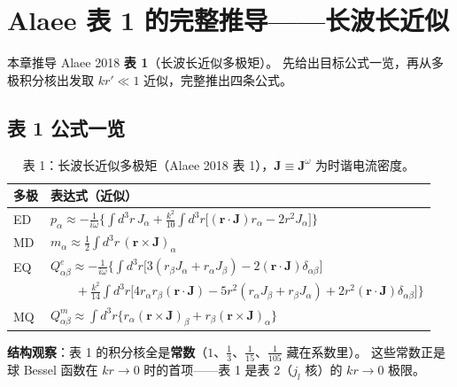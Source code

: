 \section{Alaee 表 1 的完整推导——长波长近似}

本章推导 Alaee 2018 \textbf{表 1}（长波长近似多极矩）。
先给出目标公式一览，再从多极积分核出发取 $kr'\ll1$ 近似，完整推出四条公式。

\subsection{表 1 公式一览}

\begin{table}[htbp]
\centering
\small
\begin{tabular}{ll}
\toprule
\textbf{多极} & \textbf{表达式（近似）} \\
\midrule
ED & $\displaystyle p_\alpha \approx -\frac{1}{i\omega}\Bigg\{\int d^3r\,J_\alpha
  + \frac{k^2}{10}\int d^3r\bigl[(\mathbf{r}\cdot\mathbf{J})r_\alpha - 2r^2 J_\alpha\bigr]\Bigg\}$ \\[1.2em]
MD & $\displaystyle m_\alpha \approx \frac12\int d^3r\,(\mathbf{r}\times\mathbf{J})_\alpha$ \\[1.2em]
EQ & $\displaystyle Q^e_{\alpha\beta} \approx -\frac{1}{i\omega}\Bigg\{
  \int d^3r\bigl[3(r_\beta J_\alpha + r_\alpha J_\beta) - 2(\mathbf{r}\cdot\mathbf{J})\delta_{\alpha\beta}\bigr]$ \\[0.5em]
  & $\displaystyle\qquad + \frac{k^2}{14}\int d^3r\bigl[4r_\alpha r_\beta(\mathbf{r}\cdot\mathbf{J})
  - 5r^2(r_\alpha J_\beta + r_\beta J_\alpha) + 2r^2(\mathbf{r}\cdot\mathbf{J})\delta_{\alpha\beta}\bigr]\Bigg\}$ \\[1.2em]
MQ & $\displaystyle Q^m_{\alpha\beta} \approx \int d^3r\bigl\{
  r_\alpha(\mathbf{r}\times\mathbf{J})_\beta + r_\beta(\mathbf{r}\times\mathbf{J})_\alpha\bigr\}$ \\[0.5em]
\bottomrule
\end{tabular}
\caption*{表 1：长波长近似多极矩（Alaee 2018 表 1），$\mathbf{J}\equiv\mathbf{J}^\omega$ 为时谐电流密度。}
\end{table}

\begin{noteworthy}
\textbf{结构观察}：表 1 的积分核全是\textbf{常数}（$1$、$\frac13$、$\frac1{15}$、$\frac1{105}$ 藏在系数里）。
这些常数正是球 Bessel 函数在 $kr\to0$ 时的首项——表 1 是表 2（$j_l$ 核）的 $kr\to0$ 极限。
\end{noteworthy}


